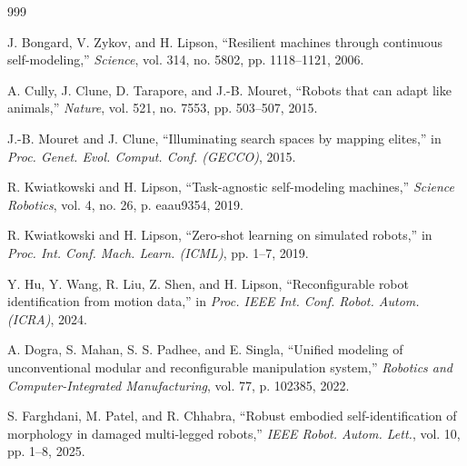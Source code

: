 \documentclass[12pt,a4paper,oneside]{report}
\begin{document}
\begin{thebibliography}{999}





J. Bongard, V. Zykov, and H. Lipson, ``Resilient machines through continuous self-modeling,'' \textit{Science}, vol. 314, no. 5802, pp. 1118--1121, 2006.




A. Cully, J. Clune, D. Tarapore, and J.-B. Mouret, ``Robots that can adapt like animals,'' \textit{Nature}, vol. 521, no. 7553, pp. 503--507, 2015.




J.-B. Mouret and J. Clune, ``Illuminating search spaces by mapping elites,'' in \textit{Proc. Genet. Evol. Comput. Conf. (GECCO)}, 2015.




R. Kwiatkowski and H. Lipson, ``Task-agnostic self-modeling machines,'' \textit{Science Robotics}, vol. 4, no. 26, p. eaau9354, 2019.




R. Kwiatkowski and H. Lipson, ``Zero-shot learning on simulated robots,'' in \textit{Proc. Int. Conf. Mach. Learn. (ICML)}, pp. 1--7, 2019.




Y. Hu, Y. Wang, R. Liu, Z. Shen, and H. Lipson, ``Reconfigurable robot identification from motion data,'' in \textit{Proc. IEEE Int. Conf. Robot. Autom. (ICRA)}, 2024.




A. Dogra, S. Mahan, S. S. Padhee, and E. Singla, ``Unified modeling of unconventional modular and reconfigurable manipulation system,'' \textit{Robotics and Computer-Integrated Manufacturing}, vol. 77, p. 102385, 2022.




S. Farghdani, M. Patel, and R. Chhabra, ``Robust embodied self-identification of morphology in damaged multi-legged robots,'' \textit{IEEE Robot. Autom. Lett.}, vol. 10, pp. 1--8, 2025.




\end{thebibliography}
\end{document}
